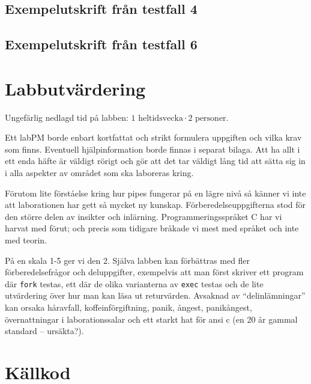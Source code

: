 \documentclass[a4paper,10pt,titlepage]{article}
\begin{document}
\subsection{Exempelutskrift från testfall 4}



\subsection{Exempelutskrift från testfall 6}



\newpage
\section{Labbutvärdering}

Ungefärlig nedlagd tid på labben: $1 \text{ heltidsvecka} \cdot 2 \text{ personer}$.

Ett labPM borde enbart kortfattat och strikt formulera uppgiften och vilka krav som finns.
Eventuell hjälpinformation borde finnas i separat bilaga. Att ha allt i ett enda häfte är väldigt rörigt och gör att det tar väldigt lång tid att sätta sig in i alla aspekter av området som ska laboreras kring.

Förutom lite förståelse kring hur pipes fungerar på en lägre nivå så känner vi inte att laborationen har gett så mycket ny kunskap. Förberedelseuppgifterna stod för den större delen av insikter och inlärning. Programmeringsspråket C har vi harvat med förut; och precis som tidigare bråkade vi mest med språket och inte med teorin.

På en skala 1-5 ger vi den $2$. Själva labben kan förbättras med fler förberedelsefrågor och deluppgifter, exempelvis att man först skriver ett program där \verb!fork! testas, ett där de olika varianterna av \verb!exec! testas och de lite utvärdering över hur man kan läsa ut returvärden. Avsaknad av ``delinlämningar'' kan orsaka håravfall, koffeinförgiftning, panik, ångest, panikångest, övernattningar i laborationssalar och ett starkt hat för ansi c (en 20 år gammal standard -- ursäkta?).

\newpage
\section{Källkod}
\label{sec:source}

\lstset{tabsize=2}
\footnotesize{}
\end{document}
